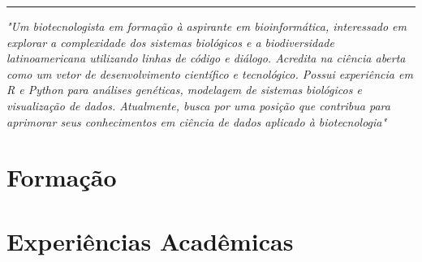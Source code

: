 \documentclass[11pt,a4paper,]{awesome-cv}
\begin{document}
\makecvheader






\begin{center}\rule{0.5\linewidth}{0.5pt}\end{center}

\begingroup
\fontsize{10}{12}\selectfont

\textit
{"Um biotecnologista em formação à aspirante em bioinformática, interessado em explorar a complexidade dos sistemas biológicos e a biodiversidade latinoamericana utilizando linhas de código e diálogo. Acredita na ciência aberta como um vetor de desenvolvimento científico e tecnológico. Possui experiência em R e Python para análises genéticas, modelagem de sistemas biológicos e visualização de dados. Atualmente, busca por uma posição que contribua para aprimorar seus conhecimentos em ciência de dados aplicado à biotecnologia"}
\endgroup

\hypertarget{formauxe7uxe3o}{%
\section{Formação}\label{formauxe7uxe3o}}

\begin{cventries}
    \vspace{-4.0mm}
    \vspace{-4.0mm}
\end{cventries}

\hypertarget{experiuxeancias-acaduxeamicas}{%
\section{Experiências Acadêmicas}\label{experiuxeancias-acaduxeamicas}}
\end{document}
